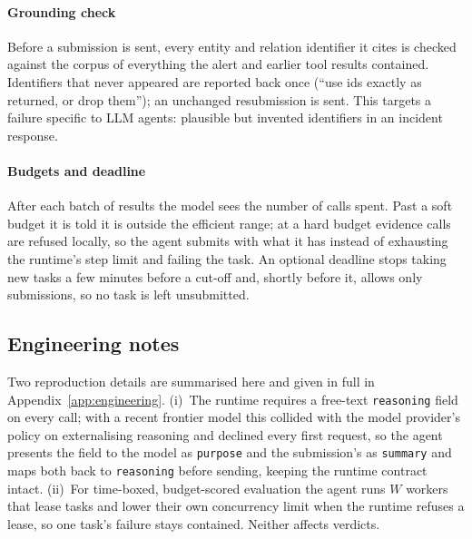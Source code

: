 \paragraph{Grounding check} Before a submission is sent, every entity and relation identifier it cites is
checked against the corpus of everything the alert and earlier tool results contained. Identifiers that never
appeared are reported back once (``use ids exactly as returned, or drop them''); an unchanged resubmission is
sent. This targets a failure specific to LLM agents: plausible but invented identifiers in an incident
response.

\paragraph{Budgets and deadline} After each batch of results the model sees the number of calls spent. Past a
soft budget it is told it is outside the efficient range; at a hard budget evidence calls are refused locally,
so the agent submits with what it has instead of exhausting the runtime's step limit and failing the task. An
optional deadline stops taking new tasks a few minutes before a cut-off and, shortly before it, allows only
submissions, so no task is left unsubmitted.

\subsection{Engineering notes}
\label{sec:alias}\label{sec:parallel}
Two reproduction details are summarised here and given in full in Appendix~\ref{app:engineering}. (i)~The
runtime requires a free-text \texttt{reasoning} field on every call; with a recent frontier model this collided
with the model provider's policy on externalising reasoning and declined every first request, so the agent
presents the field to the model as \texttt{purpose} and the submission's as \texttt{summary} and maps both back
to \texttt{reasoning} before sending, keeping the runtime contract intact. (ii)~For time-boxed, budget-scored
evaluation the agent runs $W$ workers that lease tasks and lower their own concurrency limit when the runtime
refuses a lease, so one task's failure stays contained. Neither affects verdicts.

